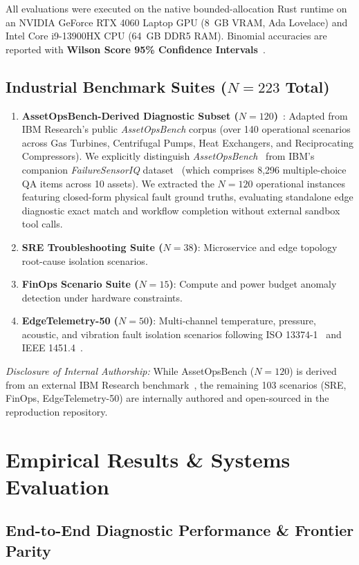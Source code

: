 \documentclass[journal]{IEEEtran}
\begin{document}
All evaluations were executed on the native bounded-allocation Rust runtime on an NVIDIA GeForce RTX 4060 Laptop GPU (8~GB VRAM, Ada Lovelace) and Intel Core i9-13900HX CPU (64~GB DDR5 RAM). Binomial accuracies are reported with \textbf{Wilson Score 95\% Confidence Intervals}~\cite{wilson1927ci}.

\subsection{Industrial Benchmark Suites ($N=223$ Total)}
\begin{enumerate}
    \item \textbf{AssetOpsBench-Derived Diagnostic Subset ($N = 120$)}~\cite{patel2025assetops}: Adapted from IBM Research's public \textit{AssetOpsBench} corpus (over 140 operational scenarios across Gas Turbines, Centrifugal Pumps, Heat Exchangers, and Reciprocating Compressors). We explicitly distinguish \textit{AssetOpsBench}~\cite{patel2025assetops} from IBM's companion \textit{FailureSensorIQ} dataset~\cite{constantinides2025failuresensoriq} (which comprises 8,296 multiple-choice QA items across 10 assets). We extracted the $N=120$ operational instances featuring closed-form physical fault ground truths, evaluating standalone edge diagnostic exact match and workflow completion without external sandbox tool calls.
    \item \textbf{SRE Troubleshooting Suite ($N = 38$)}: Microservice and edge topology root-cause isolation scenarios.
    \item \textbf{FinOps Scenario Suite ($N = 15$)}: Compute and power budget anomaly detection under hardware constraints.
    \item \textbf{EdgeTelemetry-50 ($N = 50$)}: Multi-channel temperature, pressure, acoustic, and vibration fault isolation scenarios following ISO 13374-1~\cite{iso13374} and IEEE 1451.4~\cite{ieee1451}.
\end{enumerate}
\textit{Disclosure of Internal Authorship:} While AssetOpsBench ($N=120$) is derived from an external IBM Research benchmark~\cite{patel2025assetops}, the remaining 103 scenarios (SRE, FinOps, EdgeTelemetry-50) are internally authored and open-sourced in the reproduction repository.

\section{Empirical Results \& Systems Evaluation}

\subsection{End-to-End Diagnostic Performance \& Frontier Parity}
\end{document}
